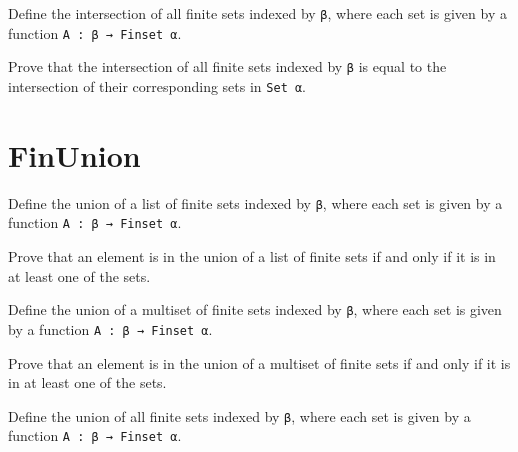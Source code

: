 \begin{definition}\label{FinInter₀}
  Define the intersection of all finite sets indexed by \verb|β|, where each set is given by a function \verb|A : β → Finset α|.
\end{definition}

\begin{lemma}\label{eq_FinInter₀}
  Prove that the intersection of all finite sets indexed by \verb|β| is equal to the intersection of their corresponding sets in \verb|Set α|.
\end{lemma}

\section{FinUnion}

\begin{definition}\label{List.FinUnion}
  \leanok
  Define the union of a list of finite sets indexed by \verb|β|, where each set is given by a function \verb|A : β → Finset α|.
\end{definition}

\begin{lemma}\label{List.eq_FinUnion}
  Prove that an element is in the union of a list of finite sets if and only if it is in at least one of the sets.
\end{lemma}

\begin{definition}\label{Multiset.FinUnion}
  Define the union of a multiset of finite sets indexed by \verb|β|, where each set is given by a function \verb|A : β → Finset α|.
\end{definition}

\begin{lemma}\label{Multiset.eq_FinUnion}
  Prove that an element is in the union of a multiset of finite sets if and only if it is in at least one of the sets.
\end{lemma}

\begin{definition}\label{FinUnion₀}
  Define the union of all finite sets indexed by \verb|β|, where each set is given by a function \verb|A : β → Finset α|.
\end{definition}

